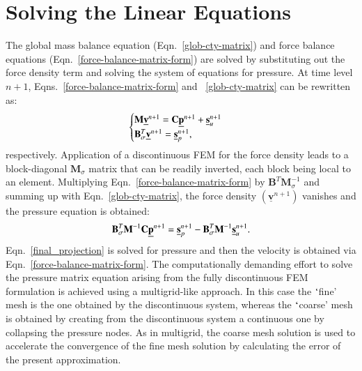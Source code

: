 \documentclass[preprint,authoryear,12pt]{elsarticle}
\begin{document}
\section{Solving the Linear Equations}\label{Section:SolvingLinearEqns}
The global mass balance equation (Eqn.~\ref{glob-cty-matrix}) and force balance equations (Eqn.~\ref{force-balance-matrix-form}) are solved by substituting out the force density term and solving the system of equations for pressure. At time level $n+1$, Eqns.~\ref{force-balance-matrix-form} and ~\ref{glob-cty-matrix} can be rewritten as:
\begin{displaymath}
\begin{cases}
 \mathbf{M} \underline{\bf v}^{n+1} = \mathbf{C}\underline{\bf p}^{n+1} + \underline{\bf s}_{u}^{n+1} \\ %
 \mathbf{B}_\sigma^{T} \underline{\bf v}^{n+1} = \underline{\bf s}_{p}^{n+1},%
\end{cases}
\end{displaymath}
respectively. Application of a discontinuous FEM for the force density leads to a block-diagonal $\mathbf{M}_{\sigma}$ matrix that can be readily inverted, each block being local to an element. Multiplying Eqn.~\ref{force-balance-matrix-form} by $\mathbf{B}^{T}\mathbf{M}_{\sigma}^{-1}$ and summing up with Eqn.~\ref{glob-cty-matrix}, the force density $\left(\underline{\mathbf v}^{n+1}\right)$ vanishes and the pressure equation is obtained:
\begin{equation}
  \mathbf{B}_\sigma^{T}\mathbf{M}^{-1} \mathbf{C} \underline{\bf p}^{n+1} = \underline{\bf s}_{p}^{n+1} - \mathbf{B}_\sigma^{T} \mathbf{M}^{-1} \underline{\bf s}_{u}^{n+1}.
  \label{final_projection}
\end{equation}
Eqn.~\ref{final_projection} is solved for pressure and then the velocity is obtained via Eqn.~\ref{force-balance-matrix-form}. The computationally demanding effort to solve the pressure matrix equation arising from the fully discontinuous FEM formulation is achieved using a multigrid-like approach. In this case the $\lq$fine' mesh is the one obtained by the discontinuous system, whereas the $\lq$coarse' mesh is obtained by creating from the discontinuous system a continuous one by collapsing the pressure nodes. As in multigrid, the coarse mesh solution is used to accelerate the convergence of the fine mesh solution by calculating the error of the present approximation.
\end{document}
